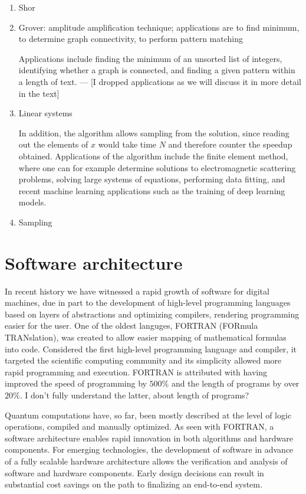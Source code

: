 \documentclass[journal]{IEEEtran}
\begin{document}
\begin{enumerate}
\item    Shor


\item    Grover: amplitude amplification technique; applications are to find minimum, to determine graph connectivity, to perform pattern matching

Applications include finding the minimum of an unsorted list of integers, identifying whether a graph is connected, and finding a given pattern within a length of text. --- [I dropped applications as we will discuss it in more detail in the text]



\item     Linear systems

In addition, the algorithm allows sampling from the solution, since reading out the elements of $x$ would take time $N$ and therefore counter the speedup obtained.
Applications of the algorithm include the finite element method, where one can for example determine solutions to electromagnetic scattering problems, solving large systems of equations, performing data fitting, and recent machine learning applications such as the training of deep learning models.


\item    Sampling
\end{enumerate}


\section{Software architecture}


In recent history we have witnessed a rapid growth of software for digital machines, due in part to the development of high-level programming languages based on layers of abstractions and optimizing compilers, rendering programming easier for the user.
One of the oldest languges, FORTRAN \cite{} (FORmula TRANslation), was created to allow easier mapping of mathematical formulas into code.  Considered the first high-level programming language and compiler, it targeted the scientific computing community and its simplicity allowed more rapid programming and execution.  FORTRAN is attributed with having improved the speed of programming by $500\%$ and the length of programs by over $20\%$. {\color{red} I don't fully understand the latter, about length of programs?}

Quantum computations have, so far, been mostly described at the level of logic operations, compiled and manually optimized. 
As seen with FORTRAN, a software architecture enables rapid innovation in both algorithms and hardware components.
For emerging technologies, the development of software in advance of a fully scalable hardware architecture allows the verification and analysis of software and hardware components.  Early design decisions can result in substantial cost savings on the path to finalizing an end-to-end system.
\end{document}
